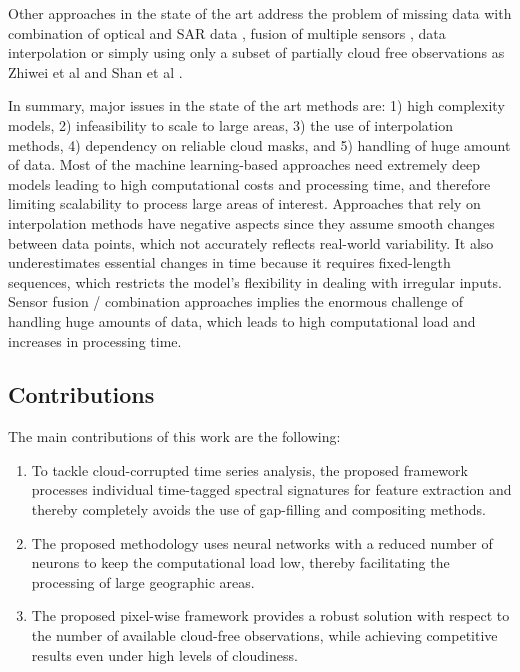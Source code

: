 \documentclass[journal,article,submit,pdftex,moreauthors]{Definitions/mdpi}
\begin{document}
Other approaches in the state of the art address the problem of missing data with combination of optical and SAR data \cite{Begue2018, Orynbaikyzy2019, Kussul2017, Tariq2022}, 
fusion of multiple sensors \cite{PierrePott2022, Heupel2018,MorenoMartinez2020}, data interpolation \cite{Russwurm2020, Kandasamy2013} or simply using only a subset of partially cloud free observations as Zhiwei et al \cite{Yi2020} and Shan et al \cite{He2022}.

In summary, major issues in the state of the art methods are: 1) high complexity models, 2) infeasibility to scale to large areas, 3) the use of interpolation methods, 4) dependency on reliable cloud masks, and 5) handling of huge amount of data. Most of the machine learning-based approaches need extremely deep models leading to high computational costs and processing time, and therefore limiting scalability to process large areas of interest. Approaches that rely on interpolation methods have negative aspects since they assume smooth changes between data points, which not accurately reflects real-world variability. It also underestimates essential changes in time because it requires fixed-length sequences, which restricts the model's flexibility in dealing with irregular inputs. Sensor fusion / combination approaches implies the enormous challenge of handling huge amounts of data, which leads to high computational load and increases in processing time. 

\subsection{Contributions}
The main contributions of this work are the following:
\begin{enumerate}
	\item To tackle cloud-corrupted time series analysis, the proposed framework processes individual time-tagged spectral signatures for feature extraction and thereby completely avoids the use of gap-filling and compositing methods.
	\item The proposed methodology uses neural networks with a reduced number of neurons to keep the computational load low, thereby facilitating the processing of large geographic areas.
	\item The proposed pixel-wise framework provides a robust solution with respect to the number of available cloud-free observations, while achieving competitive results even under high levels of cloudiness.
\end{enumerate}
\end{document}
